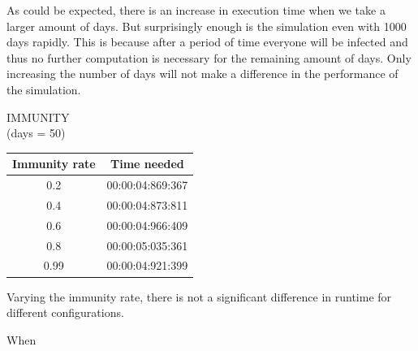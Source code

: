 \documentclass[runningheads]{llncs}
\begin{document}
As could be expected, there is an increase in execution time when we take a larger amount of days. But surprisingly enough is the simulation even with 1000 days rapidly. This is because after a period of time everyone will be infected and thus no further computation is necessary for the remaining amount of days. Only increasing the number of days will not make a difference in the performance of the simulation.

IMMUNITY\\
(days = 50)
\begin{center}
	\begin{tabular}{ | c | c |}
		\hline
		Immunity rate & Time needed \\ \hline
		0.2 & 00:00:04:869:367 \\ \hline
		0.4 & 00:00:04:873:811 \\ \hline
		0.6 & 00:00:04:966:409 \\ \hline
		0.8 & 00:00:05:035:361 \\ \hline
		0.99 & 00:00:04:921:399 \\
		\hline	
	\end{tabular}
\end{center} 

Varying the immunity rate, there is not a significant difference in runtime for different configurations.

When
\end{document}
